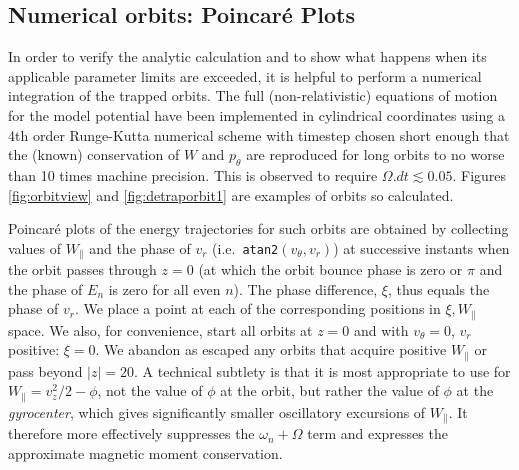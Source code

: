 \documentclass{agujournal2019}
\begin{document}
\subsection{Numerical orbits: Poincar\'e Plots}

In order to verify the analytic calculation and to show what happens
when its applicable parameter limits are exceeded, it is helpful to
perform a numerical integration of the trapped orbits. The full
(non-relativistic) equations of motion for the model potential have
been implemented in cylindrical coordinates using a 4th order
Runge-Kutta numerical scheme with timestep chosen short enough that
the (known) conservation of $W$ and $p_\theta$ are reproduced for long
orbits to no worse than 10 times machine precision. This is observed
to require $\Omega.dt\lesssim 0.05$. Figures \ref{fig:orbitview} and
\ref{fig:detraporbit1} are 
examples of orbits so calculated.

Poincar\'e plots of the energy trajectories for such orbits are
obtained by collecting values of $W_\parallel$ and the phase of $v_r$
(i.e.\ \verb!atan2!$(v_\theta,v_r)$) at successive instants when the
orbit passes through $z=0$ (at which the orbit bounce phase is zero or
$\pi$ and the phase of $E_n$ is zero for all even $n$). The phase
difference, $\xi$, thus equals the phase of $v_r$. We place a point at
each of the corresponding positions in $\xi,W_\parallel$ space. We
also, for convenience, start all orbits at $z=0$ and with
$v_\theta=0$, $v_r$ positive: $\xi=0$. We abandon as escaped any
orbits that acquire positive $W_\parallel$ or pass beyond $|z|=20$.  A
technical subtlety is that it is most appropriate to use for
$W_\parallel=v_z^2/2-\phi$, not the value of $\phi$ at the orbit, but
rather the value of $\phi$ at the \emph{gyrocenter}, which gives
significantly smaller oscillatory excursions of $W_\parallel$. It
therefore more effectively suppresses the $\omega_n+\Omega$ term and
expresses the approximate magnetic moment conservation.
\end{document}
